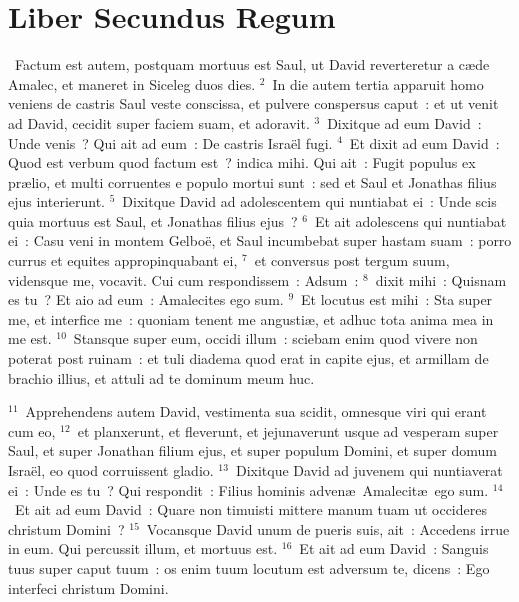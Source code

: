 {\centering \section*{Liber Secundus Regum}}\thispagestyle{empty}

~Factum est autem, postquam mortuus est Saul, ut David reverteretur a c\ae de Amalec, et maneret in Siceleg duos dies.
${}^{2}$~In die autem tertia apparuit homo veniens de castris Saul veste conscissa, et pulvere conspersus caput~: et ut venit ad David, cecidit super faciem suam, et adoravit.
${}^{3}$~Dixitque ad eum David~: Unde venis~? Qui ait ad eum~: De castris Isra\"el fugi.
${}^{4}$~Et dixit ad eum David~: Quod est verbum quod factum est~? indica mihi. Qui ait~: Fugit populus ex pr\ae lio, et multi corruentes e populo mortui sunt~: sed et Saul et Jonathas filius ejus interierunt.
${}^{5}$~Dixitque David ad adolescentem qui nuntiabat ei~: Unde scis quia mortuus est Saul, et Jonathas filius ejus~?
${}^{6}$~Et ait adolescens qui nuntiabat ei~: Casu veni in montem Gelbo\"e, et Saul incumbebat super hastam suam~: porro currus et equites appropinquabant ei,
${}^{7}$~et conversus post tergum suum, vidensque me, vocavit. Cui cum respondissem~: Adsum~:
${}^{8}$~dixit mihi~: Quisnam es tu~? Et aio ad eum~: Amalecites ego sum.
${}^{9}$~Et locutus est mihi~: Sta super me, et interfice me~: quoniam tenent me angusti\ae , et adhuc tota anima mea in me est.
${}^{10}$~Stansque super eum, occidi illum~: sciebam enim quod vivere non poterat post ruinam~: et tuli diadema quod erat in capite ejus, et armillam de brachio illius, et attuli ad te dominum meum huc.


${}^{11}$~Apprehendens autem David, vestimenta sua scidit, omnesque viri qui erant cum eo,
${}^{12}$~et planxerunt, et fleverunt, et jejunaverunt usque ad vesperam super Saul, et super Jonathan filium ejus, et super populum Domini, et super domum Isra\"el, eo quod corruissent gladio.
${}^{13}$~Dixitque David ad juvenem qui nuntiaverat ei~: Unde es tu~? Qui respondit~: Filius hominis adven\ae\ Amalecit\ae\ ego sum.
${}^{14}$~Et ait ad eum David~: Quare non timuisti mittere manum tuam ut occideres christum Domini~?
${}^{15}$~Vocansque David unum de pueris suis, ait~: Accedens irrue in eum. Qui percussit illum, et mortuus est.
${}^{16}$~Et ait ad eum David~: Sanguis tuus super caput tuum~: os enim tuum locutum est adversum te, dicens~: Ego interfeci christum Domini.


